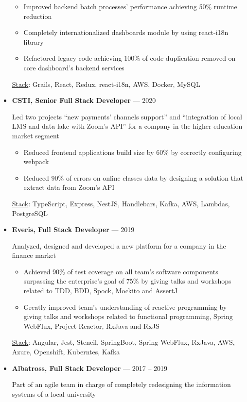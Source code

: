 \documentclass{resume}
\begin{document}
\begin{itemize}[leftmargin=*,itemsep=1ex]
    \begin{itemize}
      \item Improved backend batch processes’ performance achieving 50\% runtime reduction
      \item Completely internationalized dashboards module by using react-i18n library
      \item Refactored legacy code achieving 100\% of code duplication removed on core dashboard’s backend services
    \end{itemize}
    \underline{Stack}: Grails, React, Redux, react-i18n, AWS, Docker, MySQL
  \item 
    \textbf{CSTI, Senior Full Stack Developer} --- 2020
    \par 
    Led two projects “new payments’ channels support” and “integration of local LMS and data lake with Zoom's API”
for a company in the higher education market segment
    \begin{itemize}
      \item Reduced frontend applications build size by 60\% by correctly configuring webpack
      \item Reduced 90\% of errors on online classes data by designing a solution that extract data from Zoom’s API
    \end{itemize}
    \underline{Stack}: TypeScript, Express, NestJS, Handlebars, Kafka, AWS, Lambdas, PostgreSQL
  \item 
    \textbf{Everis, Full Stack Developer} --- 2019
    \par 
    Analyzed, designed and developed a new platform for a company in the finance market
    \begin{itemize}
      \item Achieved 90\% of test coverage on all team’s software components surpassing the enterprise's goal of 75\% by giving talks and workshops related to TDD, BDD, Spock, Mockito and AssertJ
      \item Greatly improved team’s understanding of reactive programming by giving talks and workshops related to functional programming, Spring WebFlux, Project Reactor, RxJava and RxJS
    \end{itemize}
    \underline{Stack}: Angular, Jest, Stencil, SpringBoot, Spring WebFlux, RxJava, AWS, Azure, Openshift, Kuberntes, Kafka
  \item 
    \textbf{Albatross, Full Stack Developer} --- 2017 -- 2019
    \par 
    Part of an agile team in charge of completely redesigning the information systems of a local university

\end{itemize}
\end{document}
